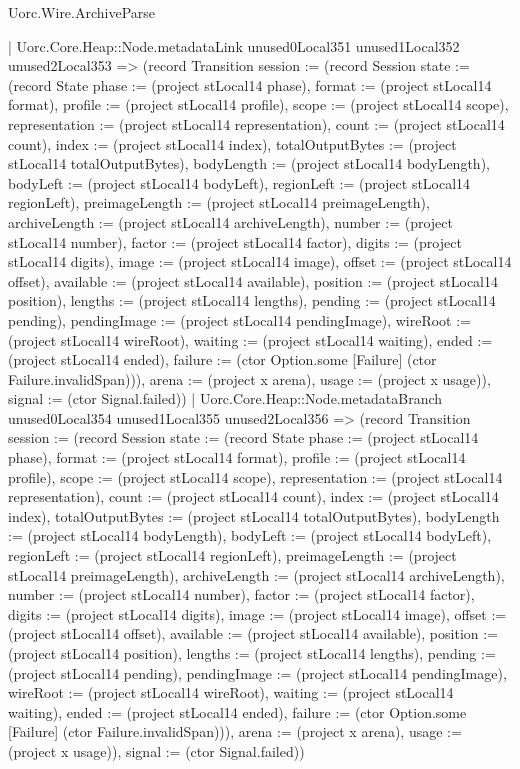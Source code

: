 \begin{lexlean}{Uorc.Wire.ArchiveParse}
\begin{semanticmodule}
{            | Uorc.Core.Heap::Node.metadataLink unused0Local351 unused1Local352 unused2Local353 => (record Transition {session := (record Session {state := (record State {phase := (project stLocal14 phase), format := (project stLocal14 format), profile := (project stLocal14 profile), scope := (project stLocal14 scope), representation := (project stLocal14 representation), count := (project stLocal14 count), index := (project stLocal14 index), totalOutputBytes := (project stLocal14 totalOutputBytes), bodyLength := (project stLocal14 bodyLength), bodyLeft := (project stLocal14 bodyLeft), regionLeft := (project stLocal14 regionLeft), preimageLength := (project stLocal14 preimageLength), archiveLength := (project stLocal14 archiveLength), number := (project stLocal14 number), factor := (project stLocal14 factor), digits := (project stLocal14 digits), image := (project stLocal14 image), offset := (project stLocal14 offset), available := (project stLocal14 available), position := (project stLocal14 position), lengths := (project stLocal14 lengths), pending := (project stLocal14 pending), pendingImage := (project stLocal14 pendingImage), wireRoot := (project stLocal14 wireRoot), waiting := (project stLocal14 waiting), ended := (project stLocal14 ended), failure := (ctor Option.some [Failure] (ctor Failure.invalidSpan))}), arena := (project x arena), usage := (project x usage)}), signal := (ctor Signal.failed)})
            | Uorc.Core.Heap::Node.metadataBranch unused0Local354 unused1Local355 unused2Local356 => (record Transition {session := (record Session {state := (record State {phase := (project stLocal14 phase), format := (project stLocal14 format), profile := (project stLocal14 profile), scope := (project stLocal14 scope), representation := (project stLocal14 representation), count := (project stLocal14 count), index := (project stLocal14 index), totalOutputBytes := (project stLocal14 totalOutputBytes), bodyLength := (project stLocal14 bodyLength), bodyLeft := (project stLocal14 bodyLeft), regionLeft := (project stLocal14 regionLeft), preimageLength := (project stLocal14 preimageLength), archiveLength := (project stLocal14 archiveLength), number := (project stLocal14 number), factor := (project stLocal14 factor), digits := (project stLocal14 digits), image := (project stLocal14 image), offset := (project stLocal14 offset), available := (project stLocal14 available), position := (project stLocal14 position), lengths := (project stLocal14 lengths), pending := (project stLocal14 pending), pendingImage := (project stLocal14 pendingImage), wireRoot := (project stLocal14 wireRoot), waiting := (project stLocal14 waiting), ended := (project stLocal14 ended), failure := (ctor Option.some [Failure] (ctor Failure.invalidSpan))}), arena := (project x arena), usage := (project x usage)}), signal := (ctor Signal.failed)})
}
\end{semanticmodule}
\end{lexlean}

